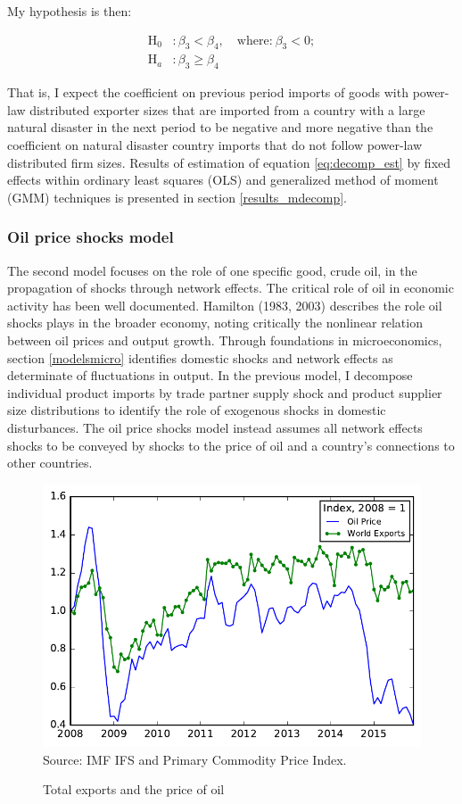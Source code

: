 \documentclass[10pt,letterpaper,pdftex]{article}
\begin{document}
My hypothesis is then:

\begin{align*}
\text{H}_0 &: \beta_3 < \beta_4, \quad \text{where:} \ \beta_3 < 0; \\
\text{H}_a &: \beta_3 \geq \beta_4 
\end{align*}

That is, I expect the coefficient on previous period imports of goods with power-law distributed exporter sizes that are imported from a country with a large natural disaster in the next period to be negative and more negative than the coefficient on natural disaster country imports that do not follow power-law distributed firm sizes. Results of estimation of equation \ref{eq:decomp_est} by fixed effects within ordinary least squares (OLS) and generalized method of moment (GMM) techniques is presented in section \ref{results_mdecomp}.

\subsubsection{Oil price shocks model} \label{models-oil}
The second model focuses on the role of one specific good, crude oil, in the propagation of shocks through network effects. The critical role of oil in economic activity has been well documented. Hamilton (1983, 2003) describes the role oil shocks plays in the broader economy, noting critically the nonlinear relation between oil prices and output growth. Through foundations in microeconomics, section \ref{modelsmicro} identifies domestic shocks and network effects as determinate of fluctuations in output. In the previous model, I decompose individual product imports by trade partner supply shock and product supplier size distributions to identify the role of exogenous shocks in domestic disturbances. The oil price shocks model instead assumes all network effects shocks to be conveyed by shocks to the price of oil and a country's connections to other countries.


\begin{figure}
  \caption{Total exports and the price of oil}
  \centering
\includegraphics[scale=0.8]{plots/wti_ix.pdf} \\
\footnotesize{Source: IMF IFS and Primary Commodity Price Index.}\\
\end{figure}
\end{document}
